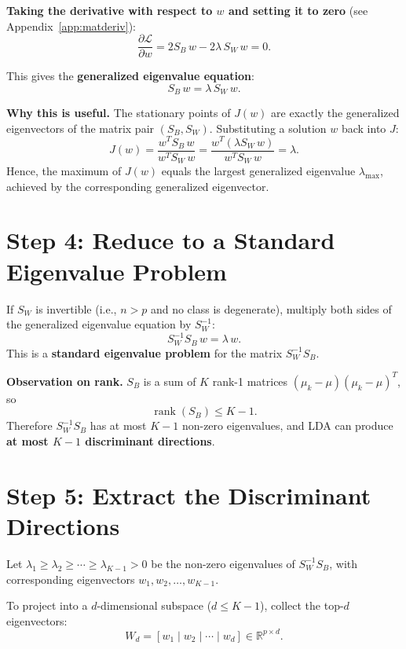 \documentclass[11pt]{article}
\begin{document}
\textbf{Taking the derivative with respect to $w$ and setting it to zero} (see Appendix~\ref{app:matderiv}):
\[
  \frac{\partial \mathcal{L}}{\partial w} = 2S_B\, w - 2\lambda\, S_W\, w = 0.
\]

This gives the \textbf{generalized eigenvalue equation}:
\[
  \boxed{S_B\, w = \lambda\, S_W\, w.}
\]

\textbf{Why this is useful.}
The stationary points of $J(w)$ are exactly the generalized eigenvectors of the matrix pair $(S_B, S_W)$.
Substituting a solution $w$ back into $J$:
\[
  J(w) = \frac{w^T S_B\, w}{w^T S_W\, w} = \frac{w^T (\lambda S_W\, w)}{w^T S_W\, w} = \lambda.
\]
Hence, the maximum of $J(w)$ equals the largest generalized eigenvalue $\lambda_{\max}$, achieved by the corresponding generalized eigenvector.

\section*{Step 4: Reduce to a Standard Eigenvalue Problem}

If $S_W$ is invertible (i.e., $n > p$ and no class is degenerate), multiply both sides of the generalized eigenvalue equation by $S_W^{-1}$:
\[
  S_W^{-1} S_B\, w = \lambda\, w.
\]
This is a \textbf{standard eigenvalue problem} for the matrix $S_W^{-1}S_B$.

\textbf{Observation on rank.}
$S_B$ is a sum of $K$ rank-1 matrices $(\mu_k - \mu)(\mu_k-\mu)^T$, so
\[
  \operatorname{rank}(S_B) \leq K - 1.
\]
Therefore $S_W^{-1}S_B$ has at most $K-1$ non-zero eigenvalues, and LDA can produce \textbf{at most $K-1$ discriminant directions}.

\section*{Step 5: Extract the Discriminant Directions}

Let $\lambda_1 \geq \lambda_2 \geq \cdots \geq \lambda_{K-1} > 0$ be the non-zero eigenvalues of $S_W^{-1}S_B$, with corresponding eigenvectors $w_1, w_2, \dots, w_{K-1}$.

To project into a $d$-dimensional subspace ($d \leq K-1$), collect the top-$d$ eigenvectors:
\[
  W_d = [w_1 \mid w_2 \mid \cdots \mid w_d] \in \mathbb{R}^{p \times d}.
\]
\end{document}
